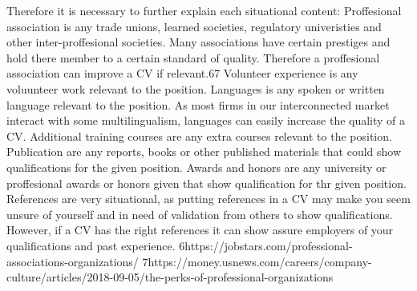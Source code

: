 Therefore it is necessary to further explain each situational content:
Proffesional association is any trade unions, learned societies, regulatory univeristies and other inter-proffesional societies.
Many associations have certain prestiges and hold there member to a certain standard of quality.
Therefore a proffesional association can improve a CV if relevant.67
Volunteer experience is any voluunteer work relevant to the position.
Languages is any spoken or written language relevant to the position.
As most firms in our interconnected market interact with some multilingualism, languages can easily increase the quality of a CV.
Additional training courses are any extra courses relevant to the position.
Publication are any reports, books or other published materials that could show qualifications for the given position.
Awards and honors are any university or proffesional awards or honors given that show qualification for thr given position.
References are very situational, as putting references in a CV may make you seem unsure of yourself and in need of validation from others to show qualifications.
However, if a CV has the right references it can show assure employers of your qualifications and past experience.
6https://jobstars.com/professional-associations-organizations/
7https://money.usnews.com/careers/company-culture/articles/2018-09-05/the-perks-of-professional-organizations
